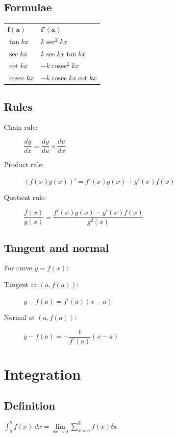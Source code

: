 \documentclass[A4paper]{article}
\DeclareMathOperator\cosec{cosec}
\begin{document}
	\subsection{Formulae}
	\begin{tabular}{ll}
		$\mathbf{f(x)}$ & $\mathbf{f'(x)}$ \\
		$\tan kx$ & $k\sec^2 kx$ \\
		$\sec kx$ & $k\sec kx \tan kx$ \\
		$\cot kx$ & $-k\cosec^2 kx$ \\
		$\cosec kx$ & $-k\cosec kx \cot kx$ \\
	\end{tabular}

	\subsection{Rules}
	\begin{description}
		\item[Chain rule:] $\dfrac{dy}{dx} = \dfrac{dy}{du} \times \dfrac{du}{dx}$
		\item[Product rule:] $(f(x)g(x))'=f'(x)g(x)+g'(x)f(x)$
		\item[Quotient rule:] $\dfrac{f(x)}{g(x)} = \dfrac{f'(x)g(x)-g'(x)f(x)}{g^2(x)}$
	\end{description}


	\subsection{Tangent and normal}
	For curve $y=f(x)$:
	\begin{description}
		\item[Tangent at $(a,f(a))$:] $y-f(a)=f'(a)(x-a)$
		\item[Normal at $(a,f(a))$:] $y-f(a)=-\dfrac{1}{f'(a)}(x-a)$
	\end{description}




	\pagebreak

	\section{Integration}
	
	\subsection{Definition}
	$\int_{a}^{b} f(x) \: dx = \lim\limits_{\delta x\rightarrow0}\sum_{x=a}^{b}f(x)\delta x$
	
\end{document}

